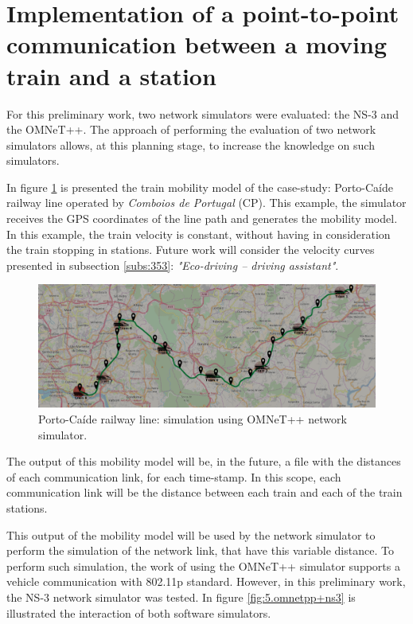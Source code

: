 \section{Implementation of a point-to-point communication between a moving train and a station}

For this preliminary work, two network simulators were evaluated: the NS-3 and the OMNeT++. The approach of performing the evaluation of two network simulators allows, at this planning stage, to increase the knowledge on such simulators.

In figure \ref{fig:5.porto-caide} is presented the train mobility model of the case-study: Porto-Caíde railway line operated by \textit{Comboios de Portugal} (CP). This example, the simulator receives the \ac{GPS} coordinates of the line path and generates the mobility model. In this example, the train velocity is constant, without having in consideration the train stopping in stations. Future work will consider the velocity curves presented in subsection \ref{subs:353}: \textit{"Eco-driving – driving assistant"}.


\begin{figure}[h!]
	\centering
	\includegraphics[width=\textwidth,keepaspectratio]{figures/50.PreliminaryW/porto-caide2}
	\caption{Porto-Caíde railway line: simulation using OMNeT++ network simulator.}
	\label{fig:5.porto-caide}
\end{figure}


The output of this mobility model will be, in the future, a file with the distances of each communication link, for each time-stamp. In this scope, each communication link will be the distance between each train and each of the train stations.

This output of the mobility model will be used by the network simulator to perform the simulation of the network link, that have this variable distance. To perform such simulation, the work of \cite{noori2013} using the OMNeT++ simulator supports a vehicle communication with 802.11p standard. However, in this preliminary work, the NS-3 network simulator was tested. In figure \ref{fig:5.omnetpp+ns3} is illustrated the interaction of both software simulators.

